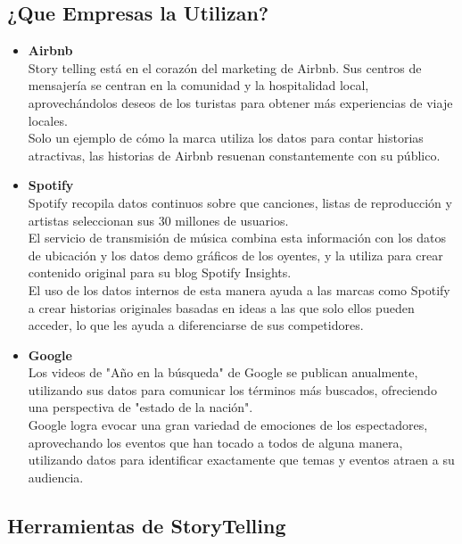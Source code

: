 \documentclass[twoside,twocolumn]{article}
\begin{document}
\subsection{¿Que Empresas la Utilizan?}
\begin{itemize}
    \item \textbf{Airbnb}\\[0.1in]
    Story telling está en el corazón del marketing de Airbnb. Sus centros de mensajería se centran en la comunidad y la hospitalidad local, aprovechándolos deseos de los turistas para obtener más experiencias de viaje locales.\\[0.1in]
    Solo un ejemplo de cómo la marca utiliza los datos para contar historias atractivas, las historias de Airbnb resuenan constantemente con su público.\\
    \item \textbf{Spotify}\\[0.1in]
    Spotify recopila datos continuos sobre que canciones, listas de reproducción y artistas seleccionan sus 30 millones de usuarios.\\
    El servicio de transmisión de música combina esta información con los datos de ubicación y los datos demo gráficos de los oyentes, y la utiliza para crear contenido original para su blog Spotify Insights.\\[0.1in]
    El uso de los datos internos de esta manera ayuda a las marcas como Spotify a crear historias originales basadas en ideas a las que solo ellos pueden acceder, lo que les ayuda a diferenciarse de sus competidores.\\
    \item \textbf{Google}\\[0.1in]
    Los videos de "Año en la búsqueda" de Google se publican anualmente, utilizando sus datos para comunicar los términos más buscados, ofreciendo una perspectiva de "estado de la nación".\\[0.1in]
    Google logra evocar una gran variedad de emociones de los espectadores, aprovechando los eventos que han tocado a todos de alguna manera, utilizando datos para identificar exactamente que temas y eventos atraen a su audiencia.
\end{itemize}

\subsection{Herramientas de StoryTelling}
\end{document}
